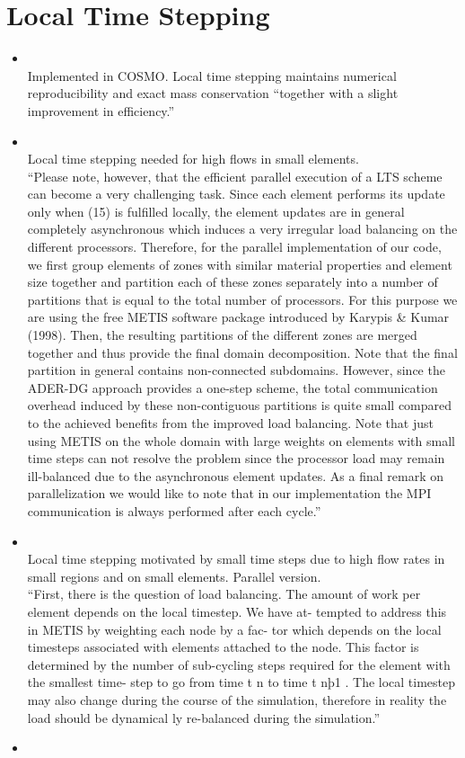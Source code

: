\documentclass[12pt]{article}
\begin{document}
\section*{Local Time Stepping}

\begin{itemize}
\item {} \ \\ 
Implemented in COSMO. Local time stepping maintains numerical reproducibility and exact mass conservation ``together with a slight improvement in
efficiency.''

\item {} \ \\ 
Local time stepping needed for high flows in small elements. \\
``Please note,
however, that the efficient parallel execution of a LTS scheme can become a very challenging task. Since each element performs its update
only when (15) is fulfilled locally, the element updates are in general completely asynchronous which induces a very irregular load balancing
on the different processors. Therefore, for the parallel implementation of our code, we first group elements of zones with similar material
properties and element size together and partition each of these zones separately into a number of partitions that is equal to the total number
of processors. For this purpose we are using the free METIS software package introduced by Karypis & Kumar (1998). Then, the resulting
partitions of the different zones are merged together and thus provide the final domain decomposition. Note that the final partition in general
contains non-connected subdomains. However, since the ADER-DG approach provides a one-step scheme, the total communication overhead
induced by these non-contiguous partitions is quite small compared to the achieved benefits from the improved load balancing. Note that just
using METIS on the whole domain with large weights on elements with small time steps can not resolve the problem since the processor
load may remain ill-balanced due to the asynchronous element updates. As a final remark on parallelization we would like to note that in our
implementation the MPI communication is always performed after each cycle.''

\item {} \ \\ 
Local time stepping motivated by small time steps due to high flow rates in small regions and on small elements. Parallel version. \\
``First, there is the question of load balancing. The amount of
work per element depends on the local timestep. We have at-
tempted to address this in METIS by weighting each node by a fac-
tor which depends on the local timesteps associated with elements
attached to the node. This factor is determined by the number of
sub-cycling steps required for the element with the smallest time-
step to go from time t n to time t nþ1 . The local timestep may also
change during the course of the simulation, therefore in reality
the load should be dynamical ly re-balanced during the simulation.''

\item \bibentry{} \ \\ 
\end{itemize}

\end{document}
